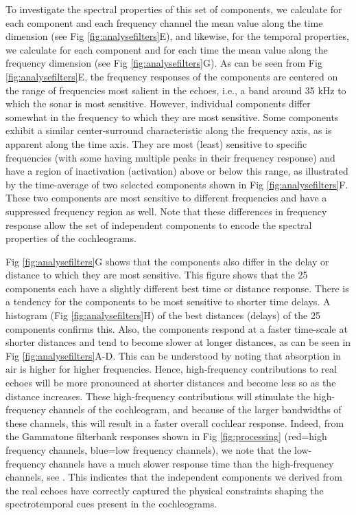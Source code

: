 \documentclass[10pt,letterpaper]{article}
\begin{document}
To investigate the spectral properties of this set of components, we calculate for each component and each frequency channel the mean value along the time dimension (see Fig \ref{fig:analysefilters}E), and likewise, for the temporal properties, we calculate for each component and for each time the mean value along the frequency dimension (see Fig \ref{fig:analysefilters}G). As can be seen from Fig \ref{fig:analysefilters}E, the frequency responses of the components are centered on the range of frequencies most salient in the echoes, i.e., a band around 35 kHz to which the sonar is most sensitive. However, individual components differ somewhat in the frequency to which they are most sensitive. Some components exhibit a similar center-surround characteristic along the frequency axis, as is apparent along the time axis. They are most (least) sensitive to specific frequencies (with some having multiple peaks in their frequency response) and have a region of inactivation (activation) above or below this range, as illustrated by the time-average of two selected components shown in Fig \ref{fig:analysefilters}F. These two components are most sensitive to different frequencies and have a suppressed frequency region as well. Note that these differences in frequency response allow the set of independent components to encode the spectral properties of the cochleograms. 

Fig \ref{fig:analysefilters}G shows that the components also differ in the delay or distance to which they are most sensitive. This figure shows that the 25 components each have a slightly different best time or distance response. There is a tendency for the components to be most sensitive to shorter time delays. A histogram (Fig \ref{fig:analysefilters}H) of the best distances (delays) of the 25 components confirms this. Also, the components respond at a faster time-scale at shorter distances and tend to become slower at longer distances, as can be seen in Fig \ref{fig:analysefilters}A-D. This can be understood by noting that absorption in air is higher for higher frequencies. Hence, high-frequency contributions to real echoes will be more pronounced at shorter distances and become less so as the distance increases. These high-frequency contributions will stimulate the high-frequency channels of the cochleogram, and because of the larger bandwidths of these channels, this will result in a faster overall cochlear response. Indeed, from the Gammatone filterbank responses shown in Fig \ref{fig:processing} (red=high frequency channels, blue=low frequency channels), we note that the low-frequency channels have a much slower response time than the high-frequency channels, see \cite{Wiegrebe2008}. This indicates that the independent components we derived from the real echoes have correctly captured the physical constraints shaping the spectrotemporal cues present in the cochleograms. 
\end{document}
